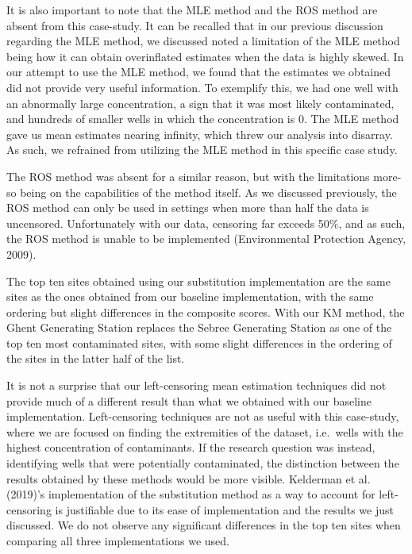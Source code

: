 \documentclass[12pt, twoside]{amherstthesis}
\begin{document}
It is also important to note that the MLE method and the ROS method are absent from this case-study. It can be recalled that in our previous discussion regarding the MLE method, we discussed noted a limitation of the MLE method being how it can obtain overinflated estimates when the data is highly skewed. In our attempt to use the MLE method, we found that the estimates we obtained did not provide very useful information. To exemplify this, we had one well with an abnormally large concentration, a sign that it was most likely contaminated, and hundreds of smaller wells in which the concentration is 0. The MLE method gave us mean estimates nearing infinity, which threw our analysis into disarray. As such, we refrained from utilizing the MLE method in this specific case study.

The ROS method was absent for a similar reason, but with the limitations more-so being on the capabilities of the method itself. As we discussed previously, the ROS method can only be used in settings when more than half the data is uncensored. Unfortunately with our data, censoring far exceeds 50\%, and as such, the ROS method is unable to be implemented (Environmental Protection Agency, 2009).

The top ten sites obtained using our substitution implementation are the same sites as the ones obtained from our baseline implementation, with the same ordering but slight differences in the composite scores. With our KM method, the Ghent Generating Station replaces the Sebree Generating Station as one of the top ten most contaminated sites, with some slight differences in the ordering of the sites in the latter half of the list.

It is not a surprise that our left-censoring mean estimation techniques did not provide much of a different result than what we obtained with our baseline implementation. Left-censoring techniques are not as useful with this case-study, where we are focused on finding the extremities of the dataset, i.e.~wells with the highest concentration of contaminants. If the research question was instead, identifying wells that were potentially contaminated, the distinction between the results obtained by these methods would be more visible. Kelderman et al. (2019)'s implementation of the substitution method as a way to account for left-censoring is justifiable due to its ease of implementation and the results we just discussed. We do not observe any significant differences in the top ten sites when comparing all three implementations we used.
\end{document}
